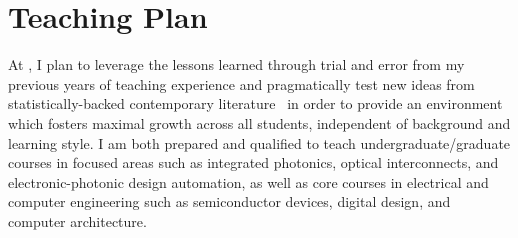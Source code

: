 \section*{Teaching Plan}
At \appSchoolShort{}, I plan to leverage the lessons learned through trial and error from my previous years of teaching experience and pragmatically test new ideas from statistically-backed contemporary literature~\cite{deslauriersMeasuringActualLearning2019,bathgatePerceivedSupportsEvidencebased2019} in order to provide an environment which fosters maximal growth across all students, independent of background and learning style. I am both prepared and qualified to teach undergraduate/graduate
courses in focused areas such as integrated photonics, optical interconnects, and electronic-photonic design automation, as well as core courses in electrical and computer engineering such as semiconductor devices, digital design, and computer architecture.